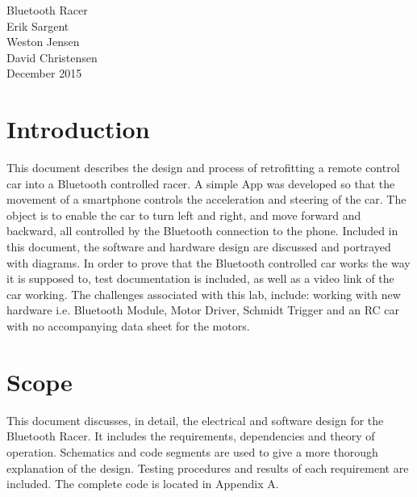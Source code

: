 \documentclass[12pt]{article}
\begin{document}
\begin{titlepage}
\vspace*{\fill}
\begin {center}
\Huge Bluetooth Racer\\


\Large Erik Sargent\\
\Large Weston Jensen\\
\Large David Christensen\\
December 2015\\
\end {center}
\vspace*{\fill}

\end{titlepage}


\tableofcontents
\listoffigures
\listoftables
\newpage

\section{Introduction}

This document describes the design and process of retrofitting a remote control car into a Bluetooth controlled racer. A simple App was developed so that the movement of a smartphone controls the acceleration and steering of the car. The object is to enable the car to turn left and right, and move forward and backward, all controlled by the Bluetooth connection to the phone. Included in this document, the software and hardware design are discussed and portrayed with diagrams. In order to prove that the Bluetooth controlled car works the way it is supposed to, test documentation is included, as well as a video link of the car working. The challenges associated with this lab, include: working with new hardware i.e. Bluetooth Module, Motor Driver, Schmidt Trigger and an RC car with no accompanying data sheet for the motors.\\

\section{Scope}
This document discusses, in detail, the electrical and software design for the Bluetooth Racer. It includes the requirements, dependencies and theory of operation. Schematics and code segments are used to give a more thorough explanation of the design. Testing procedures and results of each requirement are included. The complete code is located in Appendix A.\\
\end{document}
